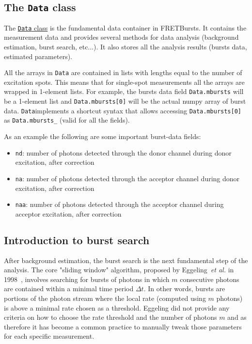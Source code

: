 \subsection{The \texttt{Data} class}
\label{sec:data_intro}

The
\href{http://fretbursts.readthedocs.org/en/latest/data_class.html}{\texttt{Data}
class} is the fundamental data container in FRETBursts. It contains the
measurement data and provides several methods for data analysis (background
estimation, burst search, etc...). It also stores all the analysis results
(bursts data, estimated parameters).

All the arrays in \texttt{Data} are contained in lists with lengths equal to the
number of excitation spots. This means that for single-spot measurements all the
arrays are wrapped in 1-element lists. For example, the bursts data field
\verb|Data.mbursts| will be a 1-element list and \verb|Data.mbursts[0]| will be
the actual numpy array of burst data. \verb|Data|implements a shortcut syntax
that allows accessing 
\verb|Data.mbursts[0]| as \verb|Data.mbursts_| (valid for all the fields).

As an example the following are some important burst-data fields:

\begin{itemize}
\item \verb|nd|: number of photons detected through the donor channel during
donor excitation, after correction
\item \verb|na|: number of photons detected through the acceptor channel during
donor excitation, after correction
\item \verb|naa|: number of photons detected through the acceptor channel during
acceptor excitation, after correction
\end{itemize}


\subsection{Introduction to burst search}
\label{sec:burstsearch_intro}

After background estimation, the burst search is the next fundamental step of
the analysis. The core "sliding window" algorithm, proposed by
Eggeling~\textit{et al.} in 1998~\cite{Eggeling_1998}, involves searching for
bursts of photons
in which $m$ consecutive photons are contained within a minimal time period
$\Delta t$. In other words, bursts are portions of the photon stream where the
local rate (computed using $m$ photons) is above a minimal rate chosen as a
threshold. Eggeling did not provide any criteria on how to choose the rate
threshold and the number of photons $m$ and as therefore it has become a common
practice to manually tweak those parameters for each specific measurement. 

